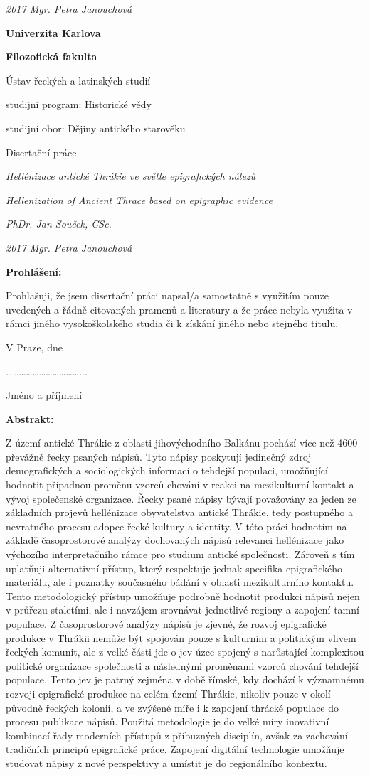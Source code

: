 {\em 2017 Mgr. Petra Janouchová}

{\bf Univerzita Karlova}

{\bf Filozofická fakulta}

Ústav řeckých a latinských studií

studijní program: Historické vědy

studijní obor: Dějiny antického starověku

Disertační práce

{\em Hellénizace antické Thrákie ve světle epigrafických nálezů}

{\em Hellenization of Ancient Thrace based on epigraphic evidence}

{\em PhDr. Jan Souček, CSc.}

{\em 2017 Mgr. Petra Janouchová}

{\bf Prohlášení:}

Prohlašuji, že jsem disertační práci napsal/a samostatně s využitím pouze uvedených a řádně citovaných pramenů a literatury a že práce nebyla využita v rámci jiného vysokoškolského studia či k získání jiného nebo stejného titulu.

V Praze, dne

\ldots{}\ldots{}\ldots{}\ldots{}\ldots{}\ldots{}\ldots{}\ldots{}\ldots{}\ldots{}\ldots{}...

Jméno a příjmení

{\bf Abstrakt:}

Z území antické Thrákie z oblasti jihovýchodního Balkánu pochází více než 4600 převážně řecky psaných nápisů. Tyto nápisy poskytují jedinečný zdroj demografických a sociologických informací o tehdejší populaci, umožňující hodnotit případnou proměnu vzorců chování v reakci na mezikulturní kontakt a vývoj společenské organizace. Řecky psané nápisy bývají považovány za jeden ze základních projevů hellénizace obyvatelstva antické Thrákie, tedy postupného a nevratného procesu adopce řecké kultury a identity. V této práci hodnotím na základě časoprostorové analýzy dochovaných nápisů relevanci hellénizace jako výchozího interpretačního rámce pro studium antické společnosti. Zároveň s tím uplatňuji alternativní přístup, který respektuje jednak specifika epigrafického materiálu, ale i poznatky současného bádání v oblasti mezikulturního kontaktu. Tento metodologický přístup umožňuje podrobně hodnotit produkci nápisů nejen v průřezu staletími, ale i navzájem srovnávat jednotlivé regiony a zapojení tamní populace. Z časoprostorové analýzy nápisů je zjevné, že rozvoj epigrafické produkce v Thrákii nemůže být spojován pouze s kulturním a politickým vlivem řeckých komunit, ale z velké části jde o jev úzce spojený s narůstající komplexitou politické organizace společnosti a následnými proměnami vzorců chování tehdejší populace. Tento jev je patrný zejména v době římské, kdy dochází k významnému rozvoji epigrafické produkce na celém území Thrákie, nikoliv pouze v okolí původně řeckých kolonií, a ve zvýšené míře i k zapojení thrácké populace do procesu publikace nápisů. Použitá metodologie je do velké míry inovativní kombinací řady moderních přístupů z příbuzných disciplín, avšak za zachování tradičních principů epigrafické práce. Zapojení digitální technologie umožňuje studovat nápisy z nové perspektivy a umístit je do regionálního kontextu.


